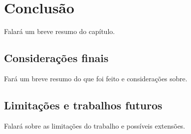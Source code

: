 \chapter{Conclusão}\label{chp:CONCLUSAO}

Falará um breve resumo do capítulo.

\section{Considerações finais}

Fará um breve resumo do que foi feito e considerações sobre.

\section{Limitações e trabalhos futuros}

Falará sobre as limitações do trabalho e possíveis extensões.
